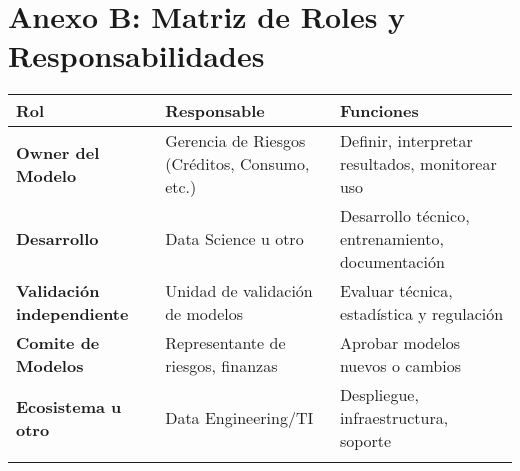 \documentclass[11pt,oneside]{article}%
\begin{document}
\section{Anexo B: Matriz de Roles y Responsabilidades}
\begin{longtable}{>{\bfseries}p{4.7cm} p{4cm} p{7.3cm}}
\toprule
\rowcolor{ficoblue}
\color{white}\textbf{Rol}  &\color{white}\textbf{Responsable}& \color{white}\textbf{Funciones } \\
 \midrule
Owner del Modelo           & Gerencia de Riesgos (Créditos, Consumo, etc.) & Definir, interpretar resultados, monitorear uso \\ 
\addlinespace
Desarrollo                      & Data Science u otro     & Desarrollo técnico, entrenamiento, documentación \\ 
\addlinespace
Validación independiente & Unidad de validación de modelos                    & Evaluar técnica, estadística y regulación \\ 
\addlinespace
Comite de Modelos          & Representante de riesgos, finanzas & Aprobar modelos nuevos o cambios \\ 
\addlinespace
Ecosistema u otro & Data Engineering/TI & Despliegue, infraestructura, soporte \\ 
\addlinespace
\bottomrule
\end{longtable}
\end{document}
